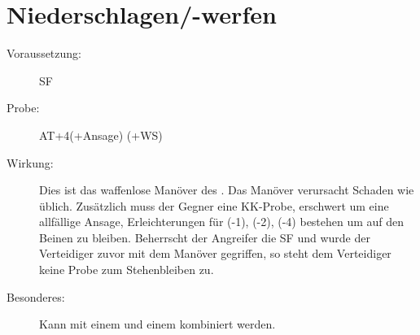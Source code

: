 \section{Niederschlagen/-werfen}
\label{uAT.niederschlagen}
\begin{description}
    \item[Voraussetzung:]
        SF 
    \item[Probe:]
        AT+4(+Ansage) (+WS)
    \item[Wirkung:]
        Dies ist das waffenlose Manöver des .
        Das Manöver verursacht Schaden wie üblich. Zusätzlich muss der Gegner eine KK-Probe, erschwert um eine allfällige Ansage, Erleichterungen für  (-1),  (-2),  (-4) bestehen um auf den Beinen zu bleiben.
        Beherrscht der Angreifer die SF  und wurde der Verteidiger zuvor mit dem Manöver  gegriffen, so steht dem Verteidiger keine Probe zum Stehenbleiben zu.
    \item[Besonderes:]
        Kann mit einem  und einem  kombiniert werden.
\end{description}

